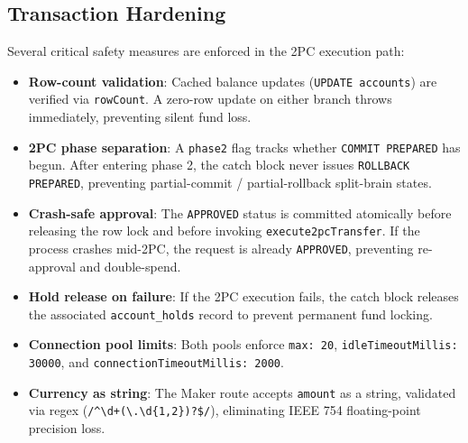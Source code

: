 \subsection{Transaction Hardening}
Several critical safety measures are enforced in the 2PC execution path:
\begin{itemize}[nosep]
  \item \textbf{Row-count validation}: Cached balance updates (\texttt{UPDATE accounts}) are verified via \texttt{rowCount}. A zero-row update on either branch throws immediately, preventing silent fund loss.
  \item \textbf{2PC phase separation}: A \texttt{phase2} flag tracks whether \texttt{COMMIT PREPARED} has begun. After entering phase 2, the catch block never issues \texttt{ROLLBACK PREPARED}, preventing partial-commit / partial-rollback split-brain states.
  \item \textbf{Crash-safe approval}: The \texttt{APPROVED} status is committed atomically before releasing the row lock and before invoking \texttt{execute2pcTransfer}. If the process crashes mid-2PC, the request is already \texttt{APPROVED}, preventing re-approval and double-spend.
  \item \textbf{Hold release on failure}: If the 2PC execution fails, the catch block releases the associated \texttt{account\_holds} record to prevent permanent fund locking.
  \item \textbf{Connection pool limits}: Both pools enforce \texttt{max: 20}, \texttt{idleTimeoutMillis: 30000}, and \texttt{connectionTimeoutMillis: 2000}.
  \item \textbf{Currency as string}: The Maker route accepts \texttt{amount} as a string, validated via regex (\texttt{/\^{}\textbackslash d+(\textbackslash.\textbackslash d\{1,2\})?\$/}), eliminating IEEE 754 floating-point precision loss.
\end{itemize}
